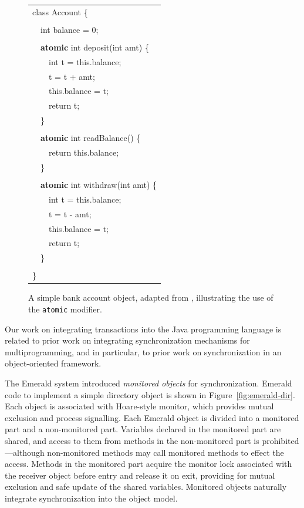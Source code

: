 \documentclass[12pt,twoside]{article}
\newcommand{\atomic}{\texttt{atomic}\xspace}
\newcommand{\sis}{\linespread{1.0}\setlength{\baselineskip}{0.8\baselineskip}}
\begin{document}
\begin{figure}
{\ttfamily\small\vspace{.25in}
\sis%
\begin{tabular}{l}
class Account \{\\
\\
~~int balance = 0;\\
\\
~~{\bf atomic} int deposit(int amt) \{\\
~~~~int t = this.balance;\\
~~~~t = t + amt;\\
~~~~this.balance = t;\\
~~~~return t;\\
~~\}\\
\\
~~{\bf atomic} int readBalance() \{\\
~~~~return this.balance;\\
~~\}\\
\\
~~{\bf atomic} int withdraw(int amt) \{\\
~~~~int t = this.balance;\\
~~~~t = t - amt;\\
~~~~this.balance = t;\\
~~~~return t;\\
~~\}\\
\\
\}\\
\end{tabular}
}\vspace{.2in}
\caption{A simple bank account object, adapted from \cite{FlanaganQa03},
  illustrating the use of the \atomic modifier.}
\label{fig:atomic}
\end{figure}

Our work on integrating transactions into the Java programming
language is related to prior work on integrating synchronization
mechanisms for multiprogramming, and in particular, to prior work on
synchronization in an object-oriented framework.

The Emerald system \cite{BlackHuJuLe86,JulSt91} introduced
\emph{monitored objects} for synchronization.  Emerald code to
implement a simple directory object is shown in
Figure~\ref{fig:emerald-dir}.  Each object is associated with
Hoare-style monitor, which provides mutual exclusion and process
signalling.  Each Emerald object is divided into a monitored part and
a non-monitored part.  Variables declared in the monitored part are
shared, and access to them from methods in the non-monitored part is
prohibited---although non-monitored methods may call monitored methods
to effect the access.  Methods in the monitored part acquire the monitor lock
associated with the receiver object before entry and release it on
exit, providing for mutual exclusion and safe update of the shared
variables.  Monitored objects naturally integrate synchronization into
the object model.
\end{document}
